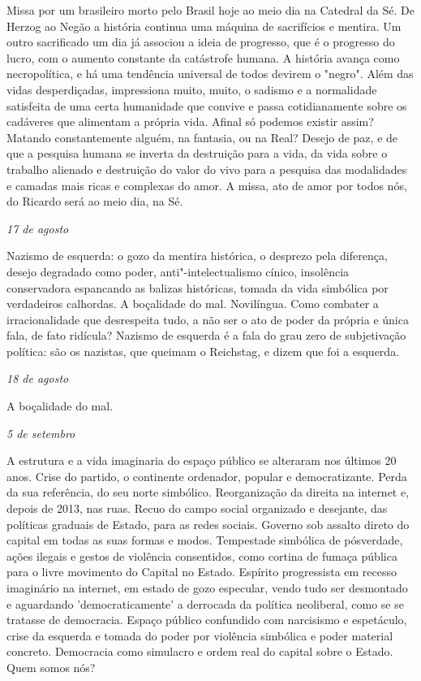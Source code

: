 Missa por um brasileiro morto pelo Brasil hoje ao meio dia na Catedral
da Sé. De Herzog ao Negão a história continua uma máquina de sacrifícios
e mentira. Um outro sacrificado um dia já associou a ideia de progresso,
que é o progresso do lucro, com o aumento constante da catástrofe
humana. A história avança como necropolítica, e há uma tendência
universal de todos devirem o "negro". Além das vidas desperdiçadas,
impressiona muito, muito, o sadismo e a normalidade satisfeita de uma
certa humanidade que convive e passa cotidianamente sobre os cadáveres
que alimentam a própria vida. Afinal só podemos existir assim? Matando
constantemente alguém, na fantasia, ou na Real? Desejo de paz, e de que
a pesquisa humana se inverta da destruição para a vida, da vida sobre o
trabalho alienado e destruição do valor do vivo para a pesquisa das
modalidades e camadas mais ricas e complexas do amor. A missa, ato de
amor por todos nós, do Ricardo será ao meio dia, na Sé.

\begin{flushright}
\emph{17 de agosto}
\end{flushright}

Nazismo de esquerda: o gozo da mentira histórica, o desprezo pela
diferença, desejo degradado como poder, anti"-intelectualismo cínico,
insolência conservadora espancando as balizas históricas, tomada da vida
simbólica por verdadeiros calhordas. A boçalidade do mal. Novilíngua.
Como combater a irracionalidade que desrespeita tudo, a não ser o ato de
poder da própria e única fala, de fato ridícula? Nazismo de esquerda é a
fala do grau zero de subjetivação política: são os nazistas, que queimam
o Reichstag, e dizem que foi a esquerda.

\begin{flushright}
\emph{18 de agosto}
\end{flushright}

A boçalidade do mal.

\begin{flushright}
\emph{5 de setembro}
\end{flushright}

A estrutura e a vida imaginaria do espaço público se alteraram nos
últimos 20 anos. Crise do partido, o continente ordenador, popular e
democratizante. Perda da sua referência, do seu norte simbólico.
Reorganização da direita na internet e, depois de 2013, nas ruas. Recuo
do campo social organizado e desejante, das políticas graduais de
Estado, para as redes sociais. Governo sob assalto direto do capital em
todas as suas formas e modos. Tempestade simbólica de pósverdade, ações
ilegais e gestos de violência consentidos, como cortina de fumaça
pública para o livre movimento do Capital no Estado. Espírito
progressista em recesso imaginário na internet, em estado de gozo
especular, vendo tudo ser desmontado e aguardando 'democraticamente' a
derrocada da política neoliberal, como se se tratasse de democracia.
Espaço público confundido com narcisismo e espetáculo, crise da esquerda
e tomada do poder por violência simbólica e poder material concreto.
Democracia como simulacro e ordem real do capital sobre o Estado. Quem
somos nós?

